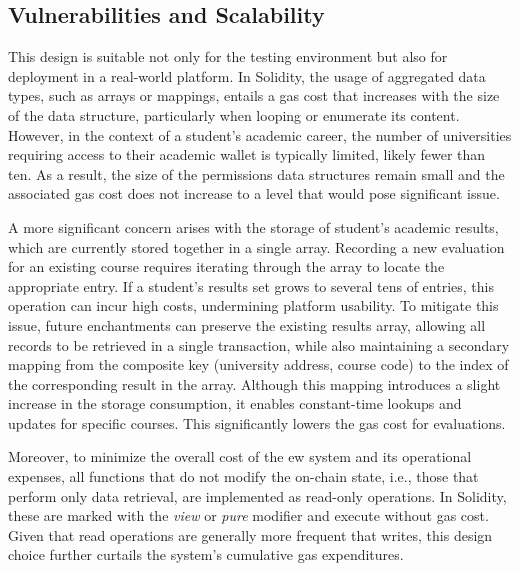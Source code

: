 \subsection{Vulnerabilities and Scalability}
This design is suitable not only for the testing environment but also for deployment in a real-world platform. In Solidity, the usage of aggregated data types, such as arrays or mappings, entails a gas cost that increases with the size of the data structure, particularly when looping or enumerate its content. However, in the context of a student's academic career, the number of universities requiring access to their academic wallet is typically limited, likely fewer than ten. As a result, the size of the permissions data structures remain small and the associated gas cost does not increase to a level that would pose significant issue.

A more significant concern arises with the storage of student's academic results, which are currently stored together in a single array. Recording a new evaluation for an existing course requires iterating through the array to locate the appropriate entry. If a student's results set grows to several tens of entries, this operation can incur high costs, undermining platform usability. To mitigate this issue, future enchantments can preserve the existing results array, allowing all records to be retrieved in a single transaction, while also maintaining a secondary mapping from the composite key (university address, course code) to the index of the corresponding result in the array. Although this mapping introduces a slight increase in the storage consumption, it enables constant-time lookups and updates for specific courses. This significantly lowers the gas cost for evaluations.  

Moreover, to minimize the overall cost of the \acrlong{ew} system and its operational expenses, all functions that do not modify the on-chain state, i.e., those that perform only data retrieval, are implemented as read-only operations. In Solidity, these are marked with the \textit{view} or \textit{pure} modifier and execute without gas cost. Given that read operations are generally more frequent that writes, this design choice further curtails the system's cumulative gas expenditures.

